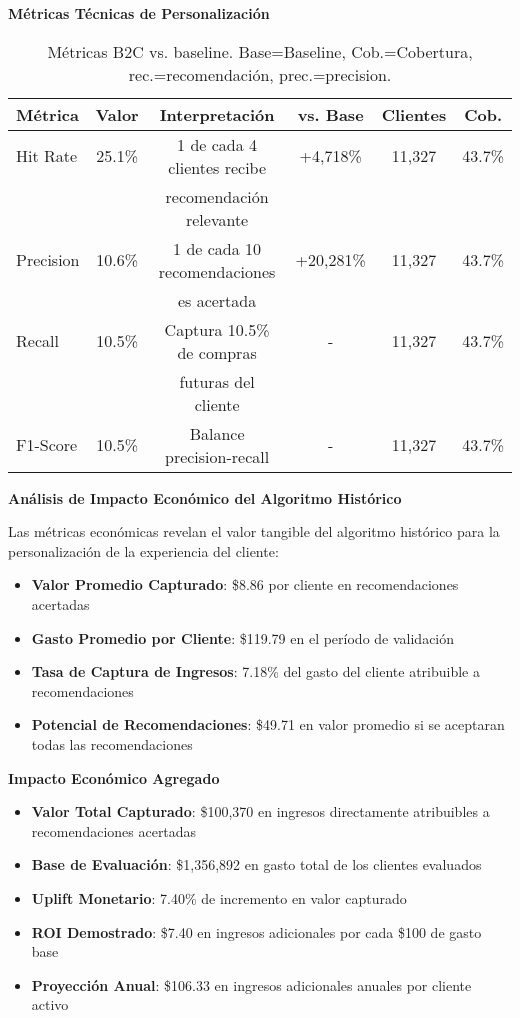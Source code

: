 \documentclass[twocolumn]{article}
\begin{document}
\textbf{Métricas Técnicas de Personalización}
\begin{table}[H]
\centering
\scriptsize
\setlength{\tabcolsep}{2.5pt}
\begin{tabular}{|l|c|c|c|c|c|}
\hline
\textbf{Métrica} & \textbf{Valor} & \textbf{Interpretación} & \textbf{vs. Base} & \textbf{Clientes} & \textbf{Cob.} \\
\hline
Hit Rate & 25.1\% & 1 de cada 4 clientes recibe & +4,718\% & 11,327 & 43.7\% \\
 & & recomendación relevante & & & \\
\hline
Precision & 10.6\% & 1 de cada 10 recomendaciones & +20,281\% & 11,327 & 43.7\% \\
 & & es acertada & & & \\
\hline
Recall & 10.5\% & Captura 10.5\% de compras & - & 11,327 & 43.7\% \\
 & & futuras del cliente & & & \\
\hline
F1-Score & 10.5\% & Balance precision-recall & - & 11,327 & 43.7\% \\
\hline
\end{tabular}
\caption{Métricas B2C vs. baseline. Base=Baseline, Cob.=Cobertura, rec.=recomendación, prec.=precision.}
\end{table}

\textbf{Análisis de Impacto Económico del Algoritmo Histórico}

Las métricas económicas revelan el valor tangible del algoritmo histórico para la personalización de la experiencia del cliente:

\begin{itemize}
    \item \textbf{Valor Promedio Capturado}: \$8.86 por cliente en recomendaciones acertadas
    \item \textbf{Gasto Promedio por Cliente}: \$119.79 en el período de validación
    \item \textbf{Tasa de Captura de Ingresos}: 7.18\% del gasto del cliente atribuible a recomendaciones
    \item \textbf{Potencial de Recomendaciones}: \$49.71 en valor promedio si se aceptaran todas las recomendaciones
\end{itemize}

\textbf{Impacto Económico Agregado}

\begin{itemize}
    \item \textbf{Valor Total Capturado}: \$100,370 en ingresos directamente atribuibles a recomendaciones acertadas
    \item \textbf{Base de Evaluación}: \$1,356,892 en gasto total de los clientes evaluados
    \item \textbf{Uplift Monetario}: 7.40\% de incremento en valor capturado
    \item \textbf{ROI Demostrado}: \$7.40 en ingresos adicionales por cada \$100 de gasto base
    \item \textbf{Proyección Anual}: \$106.33 en ingresos adicionales anuales por cliente activo
\end{itemize}
\end{document}
